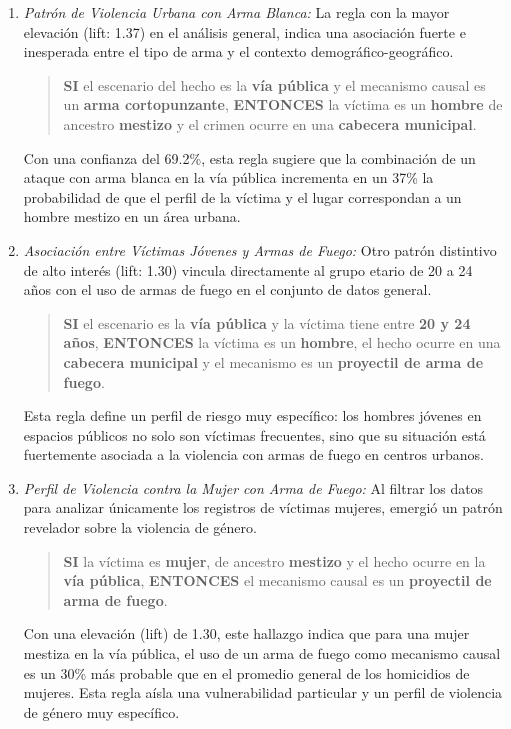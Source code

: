 \documentclass[lettersize,journal]{IEEEtran}
\begin{document}
\begin{enumerate}
    \item[1.)] \textit{Patrón de Violencia Urbana con Arma Blanca:} La regla con la mayor elevación (lift: 1.37) en el análisis general, indica una asociación fuerte e inesperada entre el tipo de arma y el contexto demográfico-geográfico.
    \begin{quote}
        \textbf{SI} el escenario del hecho es la \textbf{vía pública} y el mecanismo causal es un \textbf{arma cortopunzante},
        \textbf{ENTONCES} la víctima es un \textbf{hombre} de ancestro \textbf{mestizo} y el crimen ocurre en una \textbf{cabecera municipal}.
    \end{quote}
    Con una confianza del 69.2\%, esta regla sugiere que la combinación de un ataque con arma blanca en la vía pública incrementa en un 37\% la probabilidad de que el perfil de la víctima y el lugar correspondan a un hombre mestizo en un área urbana.

    \item[2.)] \textit{Asociación entre Víctimas Jóvenes y Armas de Fuego:} Otro patrón distintivo de alto interés (lift: 1.30) vincula directamente al grupo etario de 20 a 24 años con el uso de armas de fuego en el conjunto de datos general.
    \begin{quote}
        \textbf{SI} el escenario es la \textbf{vía pública} y la víctima tiene entre \textbf{20 y 24 años},
        \textbf{ENTONCES} la víctima es un \textbf{hombre}, el hecho ocurre en una \textbf{cabecera municipal} y el mecanismo es un \textbf{proyectil de arma de fuego}.
    \end{quote}
    Esta regla define un perfil de riesgo muy específico: los hombres jóvenes en espacios públicos no solo son víctimas frecuentes, sino que su situación está fuertemente asociada a la violencia con armas de fuego en centros urbanos.
    
    \item[3.)] \textit{Perfil de Violencia contra la Mujer con Arma de Fuego:} Al filtrar los datos para analizar únicamente los registros de víctimas mujeres, emergió un patrón revelador sobre la violencia de género.
    \begin{quote}
        \textbf{SI} la víctima es \textbf{mujer}, de ancestro \textbf{mestizo} y el hecho ocurre en la \textbf{vía pública},
        \textbf{ENTONCES} el mecanismo causal es un \textbf{proyectil de arma de fuego}.
    \end{quote}
    Con una elevación (lift) de 1.30, este hallazgo indica que para una mujer mestiza en la vía pública, el uso de un arma de fuego como mecanismo causal es un 30\% más probable que en el promedio general de los homicidios de mujeres. Esta regla aísla una vulnerabilidad particular y un perfil de violencia de género muy específico.


\end{enumerate}
\end{document}
